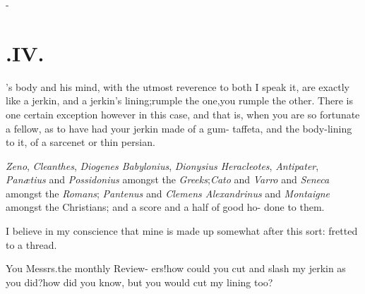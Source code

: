 \documentclass{article}
\begin{document}
\null\kern-\baselineskip
\section{.\quad  IV.}

’s body and his mind, with
the utmost reverence to both I speak it, are exactly like a jerkin,
and a jerkin’s lining;\tsk rumple the one,\tsk you rumple
the other. There is one certain exception however in this case, and
that is, 
when you are so fortunate a fellow, as to\break
have had your jerkin made of a gum-\break
taffeta, and the body-lining to it, of a\break
sarcenet or thin persian.

\textit{Zeno}, \textit{Cleanthes}, \textit{Diogenes Babylonius}, 
\textit{Dionysius Heracleotes}, \textit{Antipater}, \textit{Panætius} and
\textit{Possidonius} amongst the \textit{Greeks};\tsh \textit{Cato} and
\textit{Varro} and \textit{Seneca} amongst the \textit{Romans};\tsk
\textit{Pantenus} and \textit{Clemens Alexan\-drinus} and \textit{Montaigne} amongst
the Christians; and a score and a half of good ho-\break
{}
done to them.

I believe in my conscience that mine 
is made up somewhat after this sort:\tsh
{}
fretted to a thread.

\tsk You Messrs.\@ the monthly
Review- ers!\tsh how could you cut and slash my jerkin as
you did?\tsh how did you know, but you would cut my lining
too?
\end{document}
